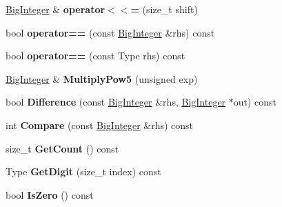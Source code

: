 \begin{DoxyCompactItemize}
\item 
\hyperlink{classinternal_1_1_big_integer}{Big\+Integer} \& {\bfseries operator$<$$<$=} (size\+\_\+t shift)\hypertarget{classinternal_1_1_big_integer_a48b12ef4676f19290dfd5816a4ef4a88}{}\label{classinternal_1_1_big_integer_a48b12ef4676f19290dfd5816a4ef4a88}

\item 
bool {\bfseries operator==} (const \hyperlink{classinternal_1_1_big_integer}{Big\+Integer} \&rhs) const \hypertarget{classinternal_1_1_big_integer_a567ecda3009de20400a2af649fb87e60}{}\label{classinternal_1_1_big_integer_a567ecda3009de20400a2af649fb87e60}

\item 
bool {\bfseries operator==} (const Type rhs) const \hypertarget{classinternal_1_1_big_integer_a329eddac1b724f82d56af2ee2c8abcc4}{}\label{classinternal_1_1_big_integer_a329eddac1b724f82d56af2ee2c8abcc4}

\item 
\hyperlink{classinternal_1_1_big_integer}{Big\+Integer} \& {\bfseries Multiply\+Pow5} (unsigned exp)\hypertarget{classinternal_1_1_big_integer_a98a13f169c27d1acfa57054f37c61763}{}\label{classinternal_1_1_big_integer_a98a13f169c27d1acfa57054f37c61763}

\item 
bool {\bfseries Difference} (const \hyperlink{classinternal_1_1_big_integer}{Big\+Integer} \&rhs, \hyperlink{classinternal_1_1_big_integer}{Big\+Integer} $\ast$out) const \hypertarget{classinternal_1_1_big_integer_a5741304ce36392adeef716e78b384b61}{}\label{classinternal_1_1_big_integer_a5741304ce36392adeef716e78b384b61}

\item 
int {\bfseries Compare} (const \hyperlink{classinternal_1_1_big_integer}{Big\+Integer} \&rhs) const \hypertarget{classinternal_1_1_big_integer_afd8b15480df5003ee6b6e1b8ecbf5f45}{}\label{classinternal_1_1_big_integer_afd8b15480df5003ee6b6e1b8ecbf5f45}

\item 
size\+\_\+t {\bfseries Get\+Count} () const \hypertarget{classinternal_1_1_big_integer_a720114cef0871c9f9c3c6a5f3a66e66a}{}\label{classinternal_1_1_big_integer_a720114cef0871c9f9c3c6a5f3a66e66a}

\item 
Type {\bfseries Get\+Digit} (size\+\_\+t index) const \hypertarget{classinternal_1_1_big_integer_a92c6854f2388875374cfb9801bea0cc8}{}\label{classinternal_1_1_big_integer_a92c6854f2388875374cfb9801bea0cc8}

\item 
bool {\bfseries Is\+Zero} () const \hypertarget{classinternal_1_1_big_integer_a99cf9cb87491a583c6b7614b0c8654fe}{}\label{classinternal_1_1_big_integer_a99cf9cb87491a583c6b7614b0c8654fe}

\end{DoxyCompactItemize}
